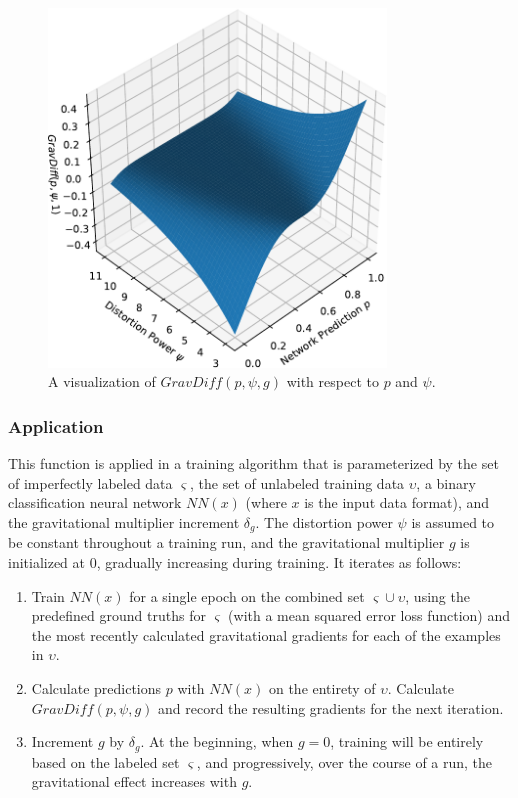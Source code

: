 \documentclass[10pt]{article}
\begin{document}
\begin{figure}[H]
    \centering
    \includegraphics[width=0.8\textwidth]{grav_diff}
    \caption{\label{grav_diff} A visualization of $GravDiff(p, \psi, g)$ with respect to $p$ and $\psi$.}
\end{figure}

\subsubsection{Application}

This function is applied in a training algorithm that is parameterized by the set of imperfectly labeled data $\varsigma$, the set of unlabeled training data $\upsilon$, a binary classification neural network $NN(x)$ (where $x$ is the input data format), and the gravitational multiplier increment $\delta_g$. The distortion power $\psi$ is assumed to be constant throughout a training run, and the gravitational multiplier $g$ is initialized at 0, gradually increasing during training. It iterates as follows:

\begin{enumerate}
    \item Train $NN(x)$ for a single epoch on the combined set $\varsigma \cup \upsilon$, using the predefined ground truths for $\varsigma$ (with a mean squared error loss function) and the most recently calculated gravitational gradients for each of the examples in $\upsilon$.
    \item Calculate predictions $p$ with $NN(x)$ on the entirety of $\upsilon$. Calculate $GravDiff(p, \psi, g)$ and record the resulting gradients for the next iteration.
    \item Increment $g$ by $\delta_{g}$. At the beginning, when $g = 0$, training will be entirely based on the labeled set $\varsigma$, and progressively, over the course of a run, the gravitational effect increases with $g$.
\end{enumerate}
\end{document}
